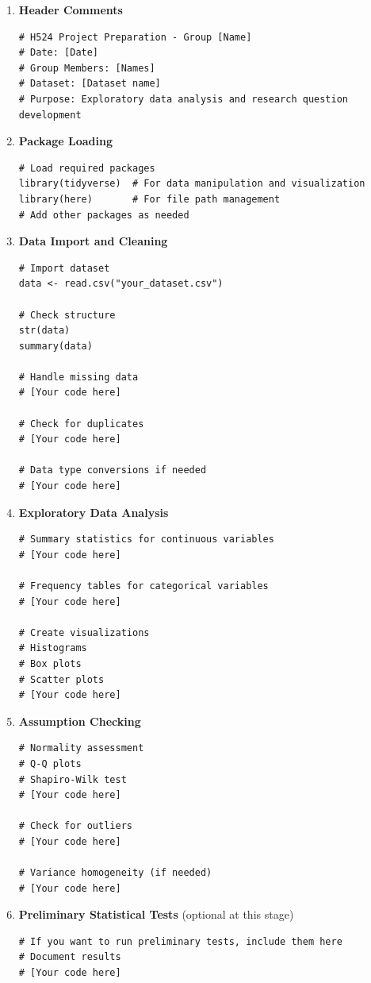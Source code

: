\documentclass[11pt]{article}
\begin{document}
\begin{enumerate}
\item \textbf{Header Comments}
\begin{lstlisting}
# H524 Project Preparation - Group [Name]
# Date: [Date]
# Group Members: [Names]
# Dataset: [Dataset name]
# Purpose: Exploratory data analysis and research question development
\end{lstlisting}

\item \textbf{Package Loading}
\begin{lstlisting}
# Load required packages
library(tidyverse)  # For data manipulation and visualization
library(here)       # For file path management
# Add other packages as needed
\end{lstlisting}

\item \textbf{Data Import and Cleaning}
\begin{lstlisting}
# Import dataset
data <- read.csv("your_dataset.csv")

# Check structure
str(data)
summary(data)

# Handle missing data
# [Your code here]

# Check for duplicates
# [Your code here]

# Data type conversions if needed
# [Your code here]
\end{lstlisting}

\item \textbf{Exploratory Data Analysis}
\begin{lstlisting}
# Summary statistics for continuous variables
# [Your code here]

# Frequency tables for categorical variables
# [Your code here]

# Create visualizations
# Histograms
# Box plots
# Scatter plots
# [Your code here]
\end{lstlisting}

\item \textbf{Assumption Checking}
\begin{lstlisting}
# Normality assessment
# Q-Q plots
# Shapiro-Wilk test
# [Your code here]

# Check for outliers
# [Your code here]

# Variance homogeneity (if needed)
# [Your code here]
\end{lstlisting}

\item \textbf{Preliminary Statistical Tests} (optional at this stage)
\begin{lstlisting}
# If you want to run preliminary tests, include them here
# Document results
# [Your code here]
\end{lstlisting}
\end{enumerate}
\end{document}

